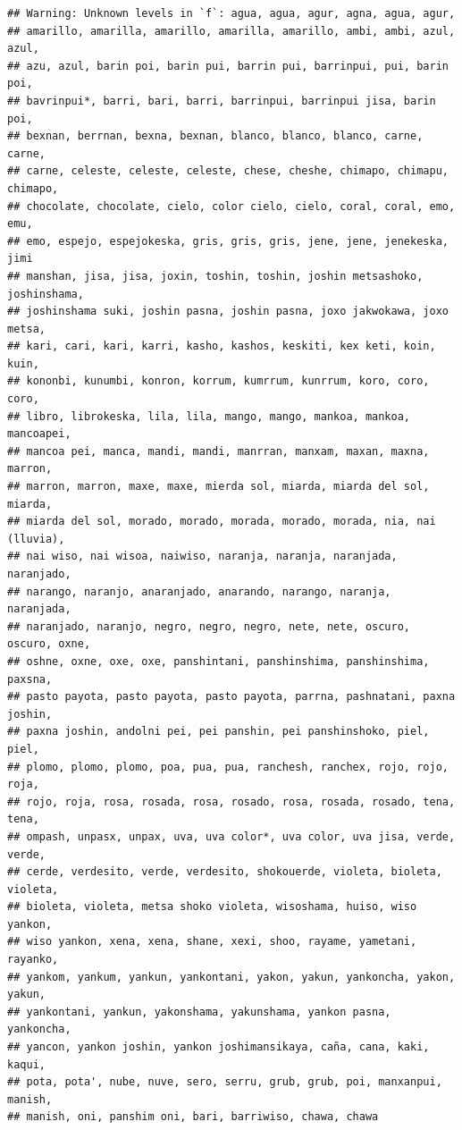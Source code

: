 \documentclass[man]{apa6}
\theoremstyle{definition}
\theoremstyle{definition}
\theoremstyle{definition}
\theoremstyle{remark}
\begin{document}
\begin{verbatim}
## Warning: Unknown levels in `f`: agua, agua, agur, agna, agua, agur,
## amarillo, amarilla, amarillo, amarilla, amarillo, ambi, ambi, azul, azul,
## azu, azul, barin poi, barin pui, barrin pui, barrinpui, pui, barin poi,
## bavrinpui*, barri, bari, barri, barrinpui, barrinpui jisa, barin poi,
## bexnan, berrnan, bexna, bexnan, blanco, blanco, blanco, carne, carne,
## carne, celeste, celeste, celeste, chese, cheshe, chimapo, chimapu, chimapo,
## chocolate, chocolate, cielo, color cielo, cielo, coral, coral, emo, emu,
## emo, espejo, espejokeska, gris, gris, gris, jene, jene, jenekeska, jimi
## manshan, jisa, jisa, joxin, toshin, toshin, joshin metsashoko, joshinshama,
## joshinshama suki, joshin pasna, joshin pasna, joxo jakwokawa, joxo metsa,
## kari, cari, kari, karri, kasho, kashos, keskiti, kex keti, koin, kuin,
## kononbi, kunumbi, konron, korrum, kumrrum, kunrrum, koro, coro, coro,
## libro, librokeska, lila, lila, mango, mango, mankoa, mankoa, mancoapei,
## mancoa pei, manca, mandi, mandi, manrran, manxam, maxan, maxna, marron,
## marron, marron, maxe, maxe, mierda sol, miarda, miarda del sol, miarda,
## miarda del sol, morado, morado, morada, morado, morada, nia, nai (lluvia),
## nai wiso, nai wisoa, naiwiso, naranja, naranja, naranjada, naranjado,
## narango, naranjo, anaranjado, anarando, narango, naranja, naranjada,
## naranjado, naranjo, negro, negro, negro, nete, nete, oscuro, oscuro, oxne,
## oshne, oxne, oxe, oxe, panshintani, panshinshima, panshinshima, paxsna,
## pasto payota, pasto payota, pasto payota, parrna, pashnatani, paxna joshin,
## paxna joshin, andolni pei, pei panshin, pei panshinshoko, piel, piel,
## plomo, plomo, plomo, poa, pua, pua, ranchesh, ranchex, rojo, rojo, roja,
## rojo, roja, rosa, rosada, rosa, rosado, rosa, rosada, rosado, tena, tena,
## ompash, unpasx, unpax, uva, uva color*, uva color, uva jisa, verde, verde,
## cerde, verdesito, verde, verdesito, shokouerde, violeta, bioleta, violeta,
## bioleta, violeta, metsa shoko violeta, wisoshama, huiso, wiso yankon,
## wiso yankon, xena, xena, shane, xexi, shoo, rayame, yametani, rayanko,
## yankom, yankum, yankun, yankontani, yakon, yakun, yankoncha, yakon, yakun,
## yankontani, yankun, yakonshama, yakunshama, yankon pasna, yankoncha,
## yancon, yankon joshin, yankon joshimansikaya, caña, cana, kaki, kaqui,
## pota, pota', nube, nuve, sero, serru, grub, grub, poi, manxanpui, manish,
## manish, oni, panshim oni, bari, barriwiso, chawa, chawa
\end{verbatim}
\end{document}
